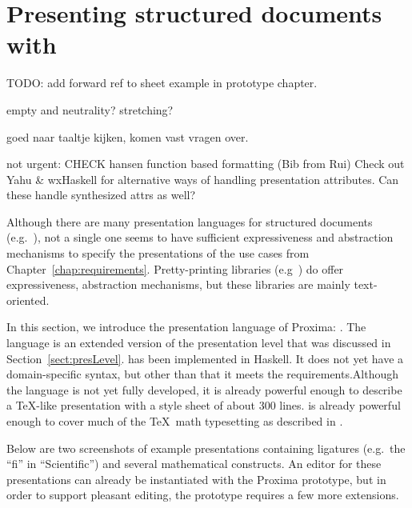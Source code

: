 \chapter{Presenting structured documents with {\Xprez}} \label{chap:presenting}



\bc
TODO:
add forward ref to sheet example in prototype chapter.



empty and neutrality? stretching?

goed naar taaltje kijken, komen vast vragen over.

not urgent:
CHECK hansen function based formatting (Bib from Rui)
Check out  Yahu & wxHaskell for alternative ways of handling presentation attributes. Can these handle synthesized attrs as well?
\ec










Although there are many presentation languages for structured documents (e.g.~\cite{css2, badros99ccss, marden98psl, xsl10, quint97thot}), not a single one seems to have sufficient expressiveness and abstraction mechanisms to specify the presentations of the use cases from Chapter~\ref{chap:requirements}. Pretty-printing libraries (e.g~\cite{oppen80prettyPrinting, swierstra98combinators, hughes1995prettyPrinting, kahl99galleyCombs, brand96generationOfFormatters}) do offer expressiveness, abstraction mechanisms, but these libraries are mainly text-oriented. 

In this section, we introduce the presentation language of Proxima: {\Xprez}. The language is an extended version of the presentation level that was discussed in Section~\ref{sect:presLevel}. {\Xprez}  has been implemented in Haskell. \bc It does not yet have a domain-specific syntax, but other than that it meets the requirements.\ec Although the language is not yet fully developed, it \bc is already powerful enough to describe a \TeX -like presentation with a style sheet of about 300 lines. \ec
 is already powerful enough to cover much of the \TeX~math typesetting as described in \cite{heckmann97functionalTex}. 
 
Below are two screenshots of example {\Xprez} presentations containing ligatures (e.g.\ the ``fi'' in ``Scientific'') and several mathematical constructs. An editor for these presentations can already be instantiated with the Proxima prototype, but in order to support pleasant editing, the prototype requires a few more extensions.

